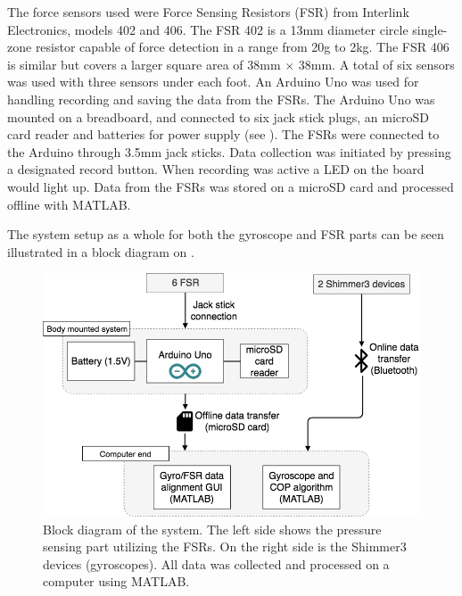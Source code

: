 The force sensors used were Force Sensing Resistors (FSR) from Interlink Electronics, models 402 and 406. The FSR 402 is a 13mm diameter circle single-zone resistor capable of force detection in a range from 20g to 2kg. The FSR 406 is similar but covers a larger square area of 38mm $\times$ 38mm. \cite{IE400} A total of six sensors was used with three sensors under each foot. 
An Arduino Uno was used for handling recording and saving the data from the FSRs. The Arduino Uno was mounted on a breadboard, and connected to six jack stick plugs, an microSD card reader and batteries for power supply (see ). The FSRs were connected to the Arduino through 3.5mm jack sticks. Data collection was initiated by pressing a designated record button. When recording was active a LED on the board would light up. Data from the FSRs was stored on a microSD card and processed offline with MATLAB.


The system setup as a whole for both the gyroscope and FSR parts can be seen illustrated in a block diagram on .

\begin{figure}[H]
	\includegraphics[width=.8\textwidth]{figures/heleSystemSetup}
	\caption{Block diagram of the system. The left side shows the pressure sensing part utilizing the FSRs. On the right side is the Shimmer3 devices (gyroscopes). All data was collected and processed on a computer using MATLAB.}
	\label{fig:heleSystemSetup}  %
\end{figure}


